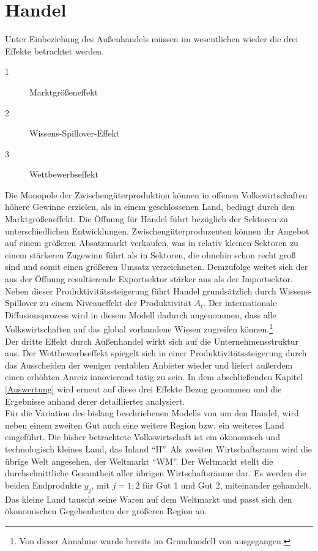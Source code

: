 \section{Handel}\label{sec:Handel}
Unter Einbeziehung des Außenhandels müssen im wesentlichen wieder die drei Effekte betrachtet werden.

	\begin{description}
		\item [1] Marktgrößeneffekt 
		\item [2] Wissens-Spillover-Effekt
		\item [3] Wettbewerbseffekt
	\end{description}
		
Die Monopole der Zwischengüterproduktion können in offenen Volkswirtschaften höhere Gewinne erzielen, als in einem geschlossenen Land, bedingt durch den Marktgrößeneffekt. Die Öffnung für Handel führt bezüglich der Sektoren zu unterschiedlichen Entwicklungen. Zwischengüterproduzenten können ihr Angebot auf einem größeren Absatzmarkt verkaufen, was in relativ kleinen Sektoren zu einem stärkeren Zugewinn führt als in Sektoren, die ohnehin schon recht groß sind und somit einen größeren Umsatz verzeichneten. Demzufolge weitet sich der aus der Öffnung resultierende Exportsektor stärker aus als der Importsektor.\\
Neben dieser Produktivitätssteigerung führt Handel grundsätzlich durch Wissens-Spillover zu einem Niveaueffekt der Produktivität $A_t$. Der internationale Diffusionsprozess wird in diesem Modell dadurch angenommen, dass alle Volkswirtschaften auf das global vorhandene Wissen zugreifen können.\footnote{Von dieser Annahme wurde bereits im Grundmodell von \cite{Acemoglu.2006} ausgegangen.}\\
Der dritte Effekt durch Außenhandel wirkt sich auf die Unternehmensstruktur aus. Der Wettbewerbseffekt spiegelt sich in einer Produktivitätssteigerung durch das Ausscheiden der weniger rentablen Anbieter wieder und liefert außerdem einen erhöhten Anreiz innovierend tätig zu sein. In dem abschließenden Kapitel \ref{Auswertung} wird erneut auf diese drei Effekte Bezug genommen und die Ergebnisse anhand derer detaillierter analysiert.\\
Für die Variation des bislang beschriebenen Modells von \cite{Acemoglu.2006} um den Handel, wird neben einem zweiten Gut auch eine weitere Region bzw. ein weiteres Land eingeführt. Die bisher betrachtete Volkswirtschaft ist ein ökonomisch und technologisch kleines Land, das Inland "`H"'. Als zweiten Wirtschaftsraum wird die übrige Welt angesehen, der Weltmarkt "`WM"'. Der Weltmarkt stellt die durchschnittliche Gesamtheit aller übrigen Wirtschaftsräume dar. Es werden die beiden Endprodukte $y_j$, mit $j=1;2$ für Gut 1 und Gut 2, miteinander gehandelt. Das kleine Land tauscht seine Waren auf dem Weltmarkt und passt sich den ökonomischen Gegebenheiten der größeren Region an. \\
